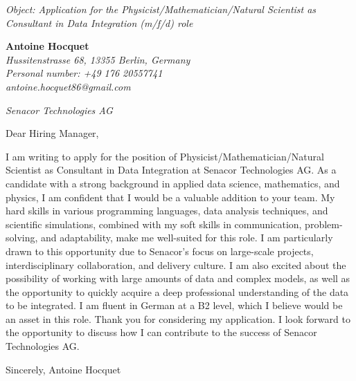 \documentclass[12pt]{letter}
\begin{document}
\begin{letter}{ \itshape Object: Application for the Physicist/Mathematician/Natural Scientist as Consultant in Data Integration (m/f/d) role }
\hfill
\begin{flushleft}
    {\bfseries Antoine Hocquet }\\[.35ex]
    \small\itshape
    Hussitenstrasse 68, 13355 Berlin, Germany\\
    Personal number: +49 176 20557741\\
    antoine.hocquet86@gmail.com
\end{flushleft}

\hfill
\begin{flushright}
    \itshape Senacor Technologies AG \\
\end{flushright}

\opening{ Dear Hiring Manager, }

I am writing to apply for the position of Physicist/Mathematician/Natural Scientist as Consultant in Data Integration at Senacor Technologies AG. As a candidate with a strong background in applied data science, mathematics, and physics, I am confident that I would be a valuable addition to your team. My hard skills in various programming languages, data analysis techniques, and scientific simulations, combined with my soft skills in communication, problem-solving, and adaptability, make me well-suited for this role. I am particularly drawn to this opportunity due to Senacor's focus on large-scale projects, interdisciplinary collaboration, and delivery culture. I am also excited about the possibility of working with large amounts of data and complex models, as well as the opportunity to quickly acquire a deep professional understanding of the data to be integrated. I am fluent in German at a B2 level, which I believe would be an asset in this role. Thank you for considering my application. I look forward to the opportunity to discuss how I can contribute to the success of Senacor Technologies AG.

\closing{ Sincerely, Antoine Hocquet }

\end{letter}
\end{document}
